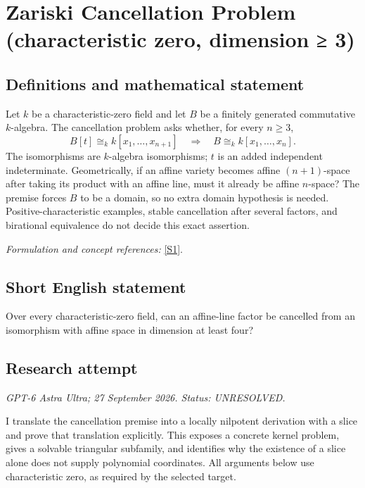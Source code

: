 \documentclass[11pt]{article}
\begin{document}
\section*{\texorpdfstring{Zariski Cancellation Problem (characteristic zero, dimension ≥ 3)}{Zariski Cancellation Problem (characteristic zero, dimension ≥ 3)}}\label{statement}
\subsection{Definitions and mathematical statement}
Let $k$ be a characteristic-zero field and let $B$ be a finitely generated commutative $k$-algebra. The cancellation problem asks whether, for every $n\ge3$,
\[
 B[t]\cong_k k[x_1,\ldots,x_{n+1}]
 \quad\Longrightarrow\quad B\cong_k k[x_1,\ldots,x_n].
\]
The isomorphisms are $k$-algebra isomorphisms; $t$ is an added independent indeterminate. Geometrically, if an affine variety becomes affine $(n+1)$-space after taking its product with an affine line, must it already be affine $n$-space? The premise forces $B$ to be a domain, so no extra domain hypothesis is needed. Positive-characteristic examples, stable cancellation after several factors, and birational equivalence do not decide this exact assertion.
\par\smallskip\textit{Formulation and concept references:} \href{https://arxiv.org/pdf/2208.14736}{[S1]}.

\subsection{Short English statement}
Over every characteristic-zero field, can an affine-line factor be cancelled from an isomorphism with affine space in dimension at least four?
\subsection{Research attempt}
\textit{GPT-6 Astra Ultra; 27 September 2026. Status: UNRESOLVED.}

I translate the cancellation premise into a locally nilpotent derivation
with a slice and prove that translation explicitly. This exposes a
concrete kernel problem, gives a solvable triangular subfamily, and
identifies why the existence of a slice alone does not supply polynomial
coordinates. All arguments below use characteristic zero, as required
by the selected target.
\end{document}
